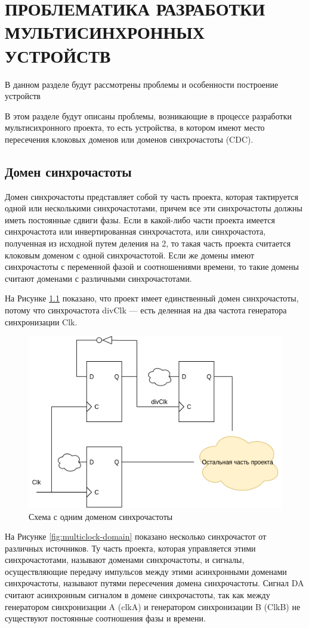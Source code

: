 \newcommand{\erassistant}{ErAssistant~}

\chapter{ПРОБЛЕМАТИКА РАЗРАБОТКИ\\ МУЛЬТИСИНХРОННЫХ УСТРОЙСТВ}

В данном разделе будут рассмотрены проблемы и особенности построение устройств


В этом разделе будут описаны проблемы, возникающие в процессе разработки мультисихронного проекта, то есть устройства, в котором имеют место пересечения клоковых доменов или доменов синхрочастоты (CDC).

\section{Домен синхрочастоты}
Домен синхрочастоты представляет собой ту часть проекта, которая тактируется одной или несколькими синхрочастотами, причем все эти синхрочастоты должны иметь постоянные сдвиги фазы. Если в какой-либо части проекта имеется синхрочастота или инвертированная синхрочастота, или синхрочастота, полученная из исходной путем деления на 2, то такая часть проекта считается клоковым доменом с одной синхрочастотой. Если же домены имеют синхрочастоты с переменной фазой и соотношениями времени, то такие домены считают доменами с различными синхрочастотами. 

На Рисунке \ref{fig:clock-domain} показано, что проект имеет единственный домен синхрочастоты, потому что синхрочастота divClk --- есть деленная на два частота генератора синхронизации Clk.

\begin{figure}[h!]
	\centering
	\includegraphics[width=0.5\linewidth]{course-scheme/images/clock-domain}
	\caption{Схема с одним доменом синхрочастоты}
	\label{fig:clock-domain}
\end{figure}


На Рисунке \ref{fig:multiclock-domain} показано несколько синхрочастот от различных источников. Ту часть проекта, которая управляется этими синхрочастотами, называют доменами синхрочастоты, и сигналы, осуществляющие передачу импульсов между этими асинхронными доменами синхрочастоты, называют путями пересечения домена синхрочастоты. Сигнал DA считают асинхронным сигналом в домене синхрочастоты, так как между генератором синхронизации A (clkA) и генератором синхронизации B (ClkB) не существуют постоянные соотношения фазы и времени. 





